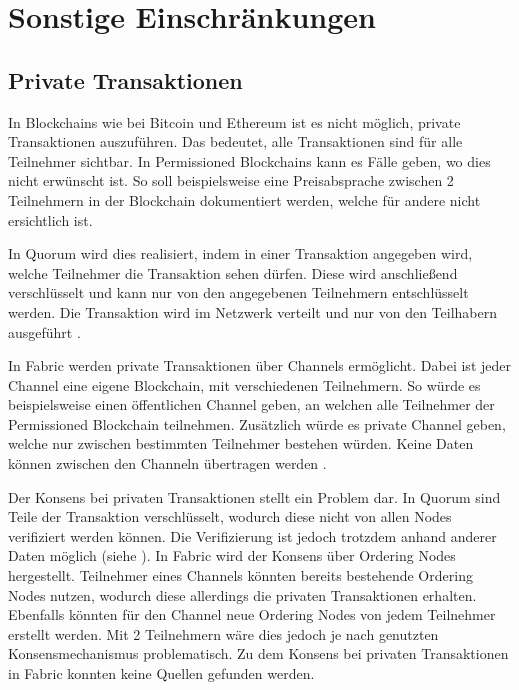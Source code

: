 \section{Sonstige Einschränkungen}

\subsection{Private Transaktionen}
In Blockchains wie bei Bitcoin und Ethereum ist es nicht möglich, private Transaktionen auszuführen. Das bedeutet, alle Transaktionen sind für alle Teilnehmer sichtbar. In Permissioned Blockchains kann es Fälle geben, wo dies nicht erwünscht ist. So soll beispielsweise eine Preisabsprache zwischen 2 Teilnehmern in der Blockchain dokumentiert werden, welche für andere nicht ersichtlich ist.

In Quorum wird dies realisiert, indem in einer Transaktion angegeben wird, welche Teilnehmer die Transaktion sehen dürfen. Diese wird anschließend verschlüsselt und kann nur von den angegebenen Teilnehmern entschlüsselt werden. Die Transaktion wird im Netzwerk verteilt und nur von den Teilhabern ausgeführt \cite{QuorumTeamTransactionProcessingQuorum2018}.

In Fabric werden private Transaktionen über Channels ermöglicht. Dabei ist jeder Channel eine eigene Blockchain, mit verschiedenen Teilnehmern. So würde es beispielsweise einen öffentlichen Channel geben, an welchen alle Teilnehmer der Permissioned Blockchain teilnehmen. Zusätzlich würde es private Channel geben, welche nur zwischen bestimmten Teilnehmer bestehen würden. Keine Daten können zwischen den Channeln übertragen werden \cite{SchererPerformanceScalabilityBlockchain2017}. 

Der Konsens bei privaten Transaktionen stellt ein Problem dar. In Quorum sind Teile der Transaktion verschlüsselt, wodurch diese nicht von allen Nodes verifiziert werden können. Die Verifizierung ist jedoch trotzdem anhand anderer Daten möglich (siehe \cite{QuorumTeamQuorumChainConsensus2018}). In Fabric wird der Konsens über Ordering Nodes hergestellt. Teilnehmer eines Channels könnten bereits bestehende Ordering Nodes nutzen, wodurch diese allerdings die privaten Transaktionen erhalten. Ebenfalls könnten für den Channel neue Ordering Nodes von jedem Teilnehmer erstellt werden. Mit 2 Teilnehmern wäre dies jedoch je nach genutzten Konsensmechanismus problematisch. Zu dem Konsens bei privaten Transaktionen in Fabric konnten keine Quellen gefunden werden.


